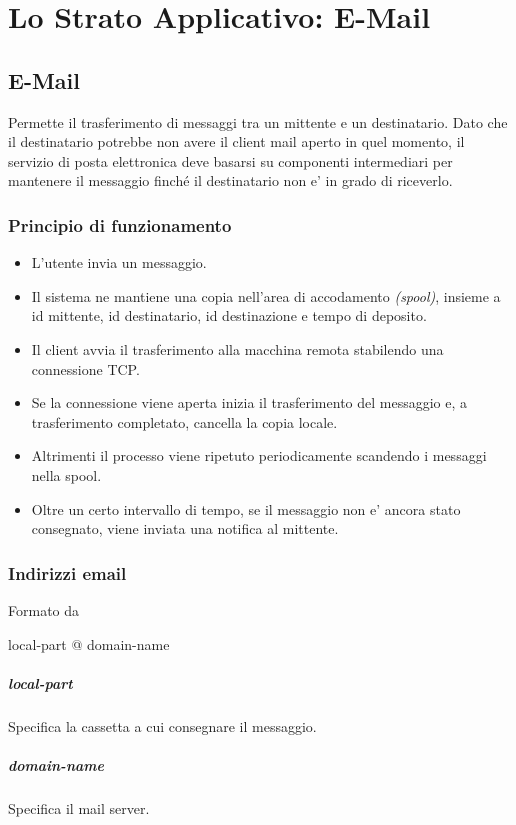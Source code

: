 \chapter{Lo Strato Applicativo: E-Mail}
\section{E-Mail}
Permette il trasferimento di messaggi tra un mittente e un destinatario.
Dato che il destinatario potrebbe non avere il client mail aperto in quel momento, il servizio di posta elettronica deve basarsi su componenti intermediari per mantenere il messaggio finché il destinatario non e' in grado di riceverlo.
\subsection{Principio di funzionamento}
\begin{itemize}
    \item L'utente invia un messaggio.
    \item Il sistema ne mantiene una copia nell'area di accodamento \textit{(spool)}, insieme a id mittente, id destinatario, id destinazione e tempo di deposito.
    \item Il client avvia il trasferimento alla macchina remota  stabilendo una connessione TCP.
    \item Se la connessione viene aperta inizia il trasferimento del messaggio e, a trasferimento completato, cancella la copia locale.
    \item Altrimenti il processo viene ripetuto periodicamente scandendo i messaggi nella spool.
    \item Oltre un certo intervallo di tempo, se il messaggio non e' ancora stato consegnato, viene inviata una notifica al mittente.
\end{itemize}
\subsection{Indirizzi email}
Formato da
\begin{center}
    local-part @ domain-name
\end{center}
\paragraph{local-part} Specifica la cassetta a cui consegnare il messaggio.
\paragraph{domain-name} Specifica il mail server.

